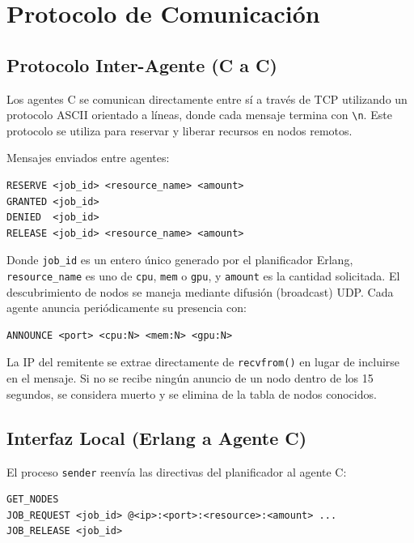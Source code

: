 \documentclass[12pt,a4paper]{article}
\begin{document}
\section{Protocolo de Comunicación}

\subsection{Protocolo Inter-Agente (C a C)}

Los agentes C se comunican directamente entre sí a través de TCP utilizando un protocolo ASCII orientado a líneas, donde cada mensaje termina con \texttt{\textbackslash n}. Este protocolo se utiliza para reservar y liberar recursos en nodos remotos.

Mensajes enviados entre agentes:

\begin{lstlisting}
RESERVE <job_id> <resource_name> <amount>
GRANTED <job_id>
DENIED  <job_id>
RELEASE <job_id> <resource_name> <amount>
\end{lstlisting}

Donde \texttt{job\_id} es un entero único generado por el planificador Erlang, \texttt{resource\_name} es uno de \texttt{cpu}, \texttt{mem} o \texttt{gpu}, y \texttt{amount} es la cantidad solicitada. El descubrimiento de nodos se maneja mediante difusión (broadcast) UDP. Cada agente anuncia periódicamente su presencia con:

\begin{lstlisting}[language={}]
ANNOUNCE <port> <cpu:N> <mem:N> <gpu:N>
\end{lstlisting}

La IP del remitente se extrae directamente de \texttt{recvfrom()} en lugar de incluirse en el mensaje. Si no se recibe ningún anuncio de un nodo dentro de los 15 segundos, se considera muerto y se elimina de la tabla de nodos conocidos.

\subsection{Interfaz Local (Erlang a Agente C)}

El proceso \texttt{sender} reenvía las directivas del planificador al agente C:

\begin{lstlisting}
GET_NODES
JOB_REQUEST <job_id> @<ip>:<port>:<resource>:<amount> ...
JOB_RELEASE <job_id>
\end{lstlisting}
\end{document}
